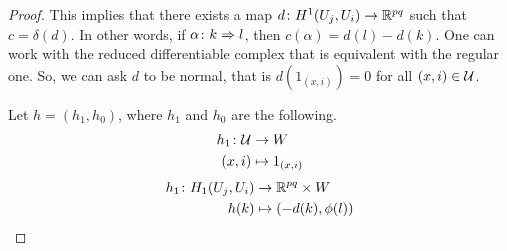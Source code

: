\begin{proof}
This implies that there exists a map $d\colon H^1(U_j,U_i)\to\mathbb{R}^{pq}$ such that $c=\delta(d)$.
In other words, if $\alpha\colon k \Rightarrow l$, then $c(\alpha)=d(l)-d(k)$.
One can work with the reduced differentiable complex that is equivalent with the regular one.
So, we can ask $d$ to be normal, that is $d(1_{(x,i)})=0$ for all $(x,i)\in\mathcal{U}$.

Let $h=(h_1,h_0)$, where $h_1$ and $h_0$ are the following.
\begin{align}
  h_1\colon\mathcal{U} &\to W \\
  (x,i) &\mapsto 1_{(x,i)}
\end{align}
\begin{align}
  h_1\colon H_1(U_j,U_i) &\to \mathbb{R}^{pq}\times W \\
  h(k) &\mapsto (-d(k), \phi(l))
\end{align}


\end{proof}
